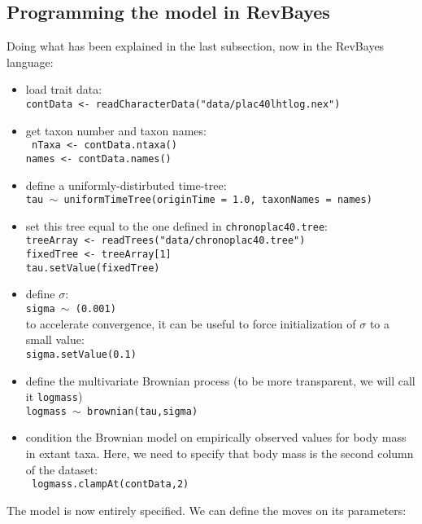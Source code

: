 \documentclass[usletter]{article}
\newcommand{\cmd}[1]{\texttt{#1}}
\begin{document}
\subsection*{Programming the model in RevBayes}

Doing what has been explained in the last subsection, now in the RevBayes language:
\begin{itemize}
\item
load trait data:
\\
\cmd{contData <- readCharacterData("data/plac40lhtlog.nex")}
\item
get taxon number and taxon names:
\\
\cmd{
nTaxa <- contData.ntaxa()
\\
names <- contData.names()
}
\item
define a uniformly-distirbuted time-tree:
\\
\cmd{tau $\sim$ uniformTimeTree(originTime = 1.0, taxonNames = names)}
\item
set this tree equal to the one defined in \cmd{chronoplac40.tree}:
\\
\cmd{treeArray <- readTrees("data/chronoplac40.tree")
\\
fixedTree <- treeArray[1]
\\
tau.setValue(fixedTree)}
\item
define $\sigma$:
\\
\cmd{sigma $\sim$ (0.001)}
\\
to accelerate convergence, it can be useful to force initialization of $\sigma$ to a small value:
\\
\cmd{sigma.setValue(0.1)}
\item
define the multivariate Brownian process (to be more transparent, we will call it \cmd{logmass})
\\
\cmd{logmass $\sim$ brownian(tau,sigma)}
\item
condition the Brownian model on empirically observed values for body mass in extant taxa.
Here, we need to specify that body mass is the second column of the dataset:
\\
\cmd{
logmass.clampAt(contData,2)
}
\end{itemize}
The model is now entirely specified. We can define the moves on its parameters:
\end{document}
